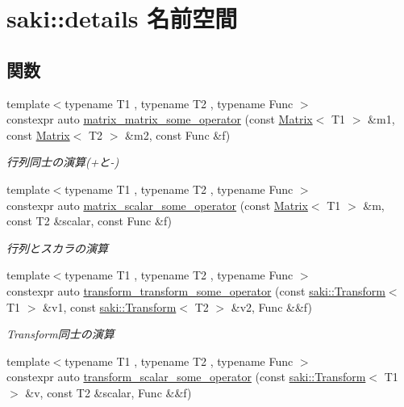 \hypertarget{namespacesaki_1_1details}{}\section{saki\+:\+:details 名前空間}
\label{namespacesaki_1_1details}
\subsection*{関数}
\begin{DoxyCompactItemize}
\item 
{\footnotesize template$<$typename T1 , typename T2 , typename Func $>$ }\\constexpr auto \mbox{\hyperlink{namespacesaki_1_1details_a7aec6dfaff24ce512bf938a30e01339a}{matrix\+\_\+matrix\+\_\+some\+\_\+operator}} (const \mbox{\hyperlink{classsaki_1_1_matrix}{Matrix}}$<$ T1 $>$ \&m1, const \mbox{\hyperlink{classsaki_1_1_matrix}{Matrix}}$<$ T2 $>$ \&m2, const Func \&f)
\begin{DoxyCompactList}\small\item\em 行列同士の演算(+と-\/) \end{DoxyCompactList}\item 
{\footnotesize template$<$typename T1 , typename T2 , typename Func $>$ }\\constexpr auto \mbox{\hyperlink{namespacesaki_1_1details_a5d1039c410e252de4fd16095e5e6beea}{matrix\+\_\+scalar\+\_\+some\+\_\+operator}} (const \mbox{\hyperlink{classsaki_1_1_matrix}{Matrix}}$<$ T1 $>$ \&m, const T2 \&scalar, const Func \&f)
\begin{DoxyCompactList}\small\item\em 行列とスカラの演算 \end{DoxyCompactList}\item 
{\footnotesize template$<$typename T1 , typename T2 , typename Func $>$ }\\constexpr auto \mbox{\hyperlink{namespacesaki_1_1details_ac8ab9fdbf09089a0272297c3be7c51d4}{transform\+\_\+transform\+\_\+some\+\_\+operator}} (const \mbox{\hyperlink{classsaki_1_1_transform}{saki\+::\+Transform}}$<$ T1 $>$ \&v1, const \mbox{\hyperlink{classsaki_1_1_transform}{saki\+::\+Transform}}$<$ T2 $>$ \&v2, Func \&\&f)
\begin{DoxyCompactList}\small\item\em Transform同士の演算 \end{DoxyCompactList}\item 
{\footnotesize template$<$typename T1 , typename T2 , typename Func $>$ }\\constexpr auto \mbox{\hyperlink{namespacesaki_1_1details_a2f5694f4bcf7f45e946384285562521e}{transform\+\_\+scalar\+\_\+some\+\_\+operator}} (const \mbox{\hyperlink{classsaki_1_1_transform}{saki\+::\+Transform}}$<$ T1 $>$ \&v, const T2 \&scalar, Func \&\&f)

\end{DoxyCompactItemize}
